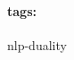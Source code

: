 \documentclass[11pt]{article}
\newcommand*{\tags}[1]{\paragraph{tags: }#1\bigskip}
\newcommand*{\xfield}[1]{\begin{mdframed}\centering #1\end{mdframed}\bigskip}
\newenvironment{note}{}{}
\begin{document}
\tags{nlp-duality}
\begin{note}
  \xfield{}
\end{note}
\end{document}
